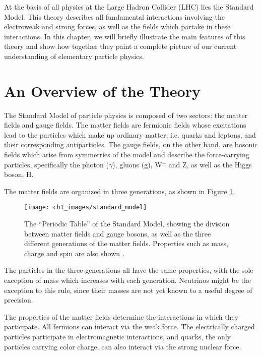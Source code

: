 \documentclass[10pt,a4paper]{book}
\begin{document}
At the basis of all physics at the Large Hadron Collider (LHC) lies the Standard Model. This theory describes all fundamental interactions involving the electroweak and strong forces, as well as the fields which partake in these interactions. In this chapter, we will briefly illustrate the main features of this theory and show how together they paint a complete picture of our current understanding of elementary particle physics.



\section{An Overview of the Theory}
The Standard Model of particle physics is composed of two sectors: the matter fields and gauge fields. The matter fields are fermionic fields whose excitations lead to the particles which make up ordinary matter, i.e. quarks and leptons, and their corresponding antiparticles. The gauge fields, on the other hand, are bosonic fields which arise from symmetries of the model and describe the force-carrying particles, specifically the photon ($\gamma$), gluons (g), W$^{\pm}$ and Z, as well as the Higgs boson, H.

The matter fields are organized in three generations, as shown in Figure \ref{Standard Model particles}.
\begin{figure}
\centering
\texttt{[image: ch1\_images/standard\_model]}
\caption{The ``Periodic Table'' of the Standard Model, showing the division between matter fields and gauge bosons, as well as the three different generations of the matter fields. Properties such as mass, charge and spin are also shown \cite{enwiki:1039528522}.}
\label{Standard Model particles}
\end{figure}
The particles in the three generations all have the same properties, with the sole exception of mass which increases with each generation. Neutrinos might be the exception to this rule, since their masses are not yet known to a useful degree of precision. 

The properties of the matter fields determine the interactions in which they participate. All fermions can interact via the weak force. The electrically charged particles participate in electromagnetic interactions, and quarks, the only particles carrying color charge, can also interact via the strong nuclear force.
\end{document}
